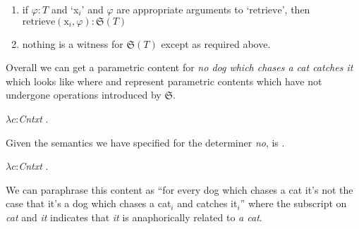 \begin{ex}
\begin{subex}
\begin{enumerate}
  \item if $\varphi:T$ and `x$_i$' and $\varphi$ are appropriate
    arguments to `$\mathrm{retrieve}$', then
    $\mathrm{retrieve}(\text{x}_i,\varphi):\mathfrak{S}(T)$
    
  \item nothing is a witness for $\mathfrak{S}(T)$ except as required above.
 
  \end{enumerate} 
  
 
\end{subex} 
\label{ex:storage-donkey-type}   
\end{ex}



Overall we can get a parametric content for \textit{no dog which
  chases a cat catches it} which looks like \nexteg{} where
 \usebox{\boxone}
and \usebox{\boxtwo} represent parametric contents
which have not undergone operations introduced by $\mathfrak{S}$.
\begin{ex} 
  $\lambda c$:\textit{Cntxt} . 
\end{ex} 
Given the semantics we have specified for the determiner \textit{no},
\preveg{} is \nexteg{}.
\begin{ex} 
  $\lambda c$:\textit{Cntxt} . 
\end{ex} 
We can paraphrase this content as ``for every dog which chases a cat
it's not the case that it's a dog which chases a cat$_i$ and catches
it$_i$'' where the subscript on \textit{cat} and \textit{it} indicates
that \textit{it} is anaphorically related to \textit{a cat}.



